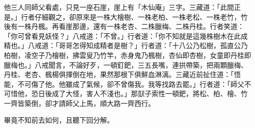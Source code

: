 他三人同師父看處，只見一座石崖，崖上有「木仙庵」三字。三藏道：「此間正是。」行者仔細觀之，卻原來是一株大檜樹、一株老柏、一株老松、一株老竹，竹後有一株丹楓。再看崖那邊，還有一株老杏、二株臘梅、二株丹桂。行者笑道：「你可曾看見妖怪？」八戒道：「不曾。」行者道：「你不知就是這幾株樹木在此成精也。」八戒道：「哥哥怎得知成精者是樹？」行者道：「十八公乃松樹，孤直公乃柏樹，凌空子乃檜樹，拂雲叟乃竹竿，赤身鬼乃楓樹，杏仙即杏樹，女童即丹桂即臘梅也。」八戒聞言，不論好歹，一頓釘鈀，三五長嘴，連拱帶築，把兩顆臘梅、丹桂、老杏、楓楊俱揮倒在地，果然那根下俱鮮血淋漓。三藏近前扯住道：「悟能，不可傷了他。他雖成了氣候，卻不曾傷我。我等找路去罷。」行者道：「師父不可惜他，恐日後成了大怪，害人不淺也。」那獃子索性一頓鈀，將松、柏、檜、竹一齊皆築倒，卻才請師父上馬，順大路一齊西行。

畢竟不知前去如何，且聽下回分解。
